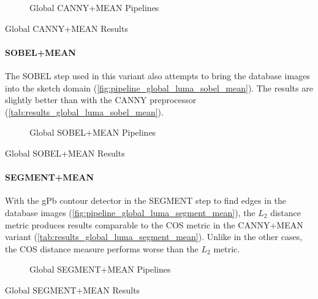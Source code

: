 \begin{figure}[h]
    \centering
    
    \caption[Global CANNY+MEAN Pipelines]{
        Global CANNY+MEAN Pipelines
    }
    \label{fig:pipeline_global_luma_canny_mean}
\end{figure}

\begin{table}[h]
    \centering
    
    \caption[Global CANNY+MEAN Results]{
        Global CANNY+MEAN Results
    }
    \label{tab:results_global_luma_canny_mean}
\end{table}

\FloatBarrier
\paragraph{SOBEL+MEAN}

The SOBEL step used in this variant also attempts to bring the database images
into the sketch domain (\autoref{fig:pipeline_global_luma_sobel_mean}). The
results are slightly better than with the CANNY preprocessor
(\autoref{tab:results_global_luma_sobel_mean}).

\begin{figure}[h!]
    \centering
    
    \caption[Global SOBEL+MEAN Pipelines]{
        Global SOBEL+MEAN Pipelines
    }
    \label{fig:pipeline_global_luma_sobel_mean}
\end{figure}

\begin{table}[h!]
    \centering
    
    \caption[Global SOBEL+MEAN Results]{
        Global SOBEL+MEAN Results
    }
    \label{tab:results_global_luma_sobel_mean}
\end{table}

\FloatBarrier
\paragraph{SEGMENT+MEAN}

With the gPb contour detector in the SEGMENT step to find edges in the database
images (\autoref{fig:pipeline_global_luma_segment_mean}), the $L_2$ distance
metric produces results comparable to the COS metric in the CANNY+MEAN variant
(\autoref{tab:results_global_luma_segment_mean}).  Unlike in the other cases,
the COS distance measure performs worse than the $L_2$ metric.

\begin{figure}[h]
    \centering
    
    \caption[Global SEGMENT+MEAN Pipelines]{
        Global SEGMENT+MEAN Pipelines
    }
    \label{fig:pipeline_global_luma_segment_mean}
\end{figure}

\begin{table}[h]
    \centering
    
    \caption[Global SEGMENT+MEAN Results]{
        Global SEGMENT+MEAN Results
    }
    \label{tab:results_global_luma_segment_mean}
\end{table}

\FloatBarrier
